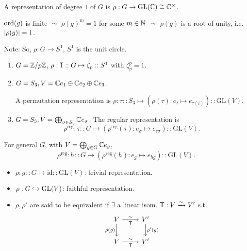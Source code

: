 \begin{example}
  A representation of degree $1$ of $G$ is $\rho: G \to \text{GL}(\mathbb{C})
  \cong \mathbb{C}^\times$.

  $\operatorname{ord}(g)$ is finite $\leadsto$ $\rho(g)^m = 1$ for some $m \in \mathbb{N}$
  $\leadsto$ $\rho(g)$ is a root of unity, i.e. $\lvert\rho(g)\rvert = 1$.

  Note: So, $\rho: G \to S^1$, $S^1$ is the unit circle.

  \begin{enumerate}
    \item $G = {\mathbb{Z}}/{p\mathbb{Z}}$,
      $\rho: \overline{1} :: G \mapsto \zeta_p :: S^1$ with $\zeta_p^p = 1$.
    \item $G = S_3, V = \mathbb{C} e_1 \oplus \mathbb{C} e_2 \oplus \mathbb{C} e_3$.

      A permutation representation is
      $\rho: \tau :: S_3 \mapsto (\rho(\tau): e_i \mapsto e_{\tau(i)})
      :: \text{GL}(V)$.

    \item $G = S_3, V = \bigoplus_{\sigma \in S_3} \mathbb{C} e_{\sigma}$.
      The regular representation is
      \[ \rho^{\text{reg}}: \tau :: G \mapsto
      (\rho^{\text{reg}}(\tau): e_{\sigma} \mapsto e_{\tau \sigma})
      :: \text{GL}(V). \]
  \end{enumerate}
\end{example}

For general $G$, with $V = \bigoplus_{g\in G} \mathbb{C} e_g$,
\[ \rho^{\text{reg}}: h :: G \mapsto
  (\rho^{\text{reg}}(h): e_{g} \mapsto e_{hg})
:: \text{GL}(V). \]

\begin{definition} \mbox{}
  \begin{itemize}
    \item $\rho: g :: G \mapsto \text{id} :: \text{GL}(V)$:
      trivial representation.
    \item $\rho: G \hookrightarrow \text{GL}(V)$: faithful representation.
    \item $\rho, \rho'$ are said to be equivalent if $\exists$ a linear isom.
      ${\sf T}: V \xrightarrow{\sim} V'$ s.t.
      \[
        \begin{tikzcd}
          V \arrow[d, "\rho(g)"'] \arrow[r, "{\sf T}"', "\sim"] & V' \arrow[d, "\rho'(g)"] \\
          V \arrow[r, "{\sf T}"', "\sim"] & V'
        \end{tikzcd}
      \]
  \end{itemize}
\end{definition}

